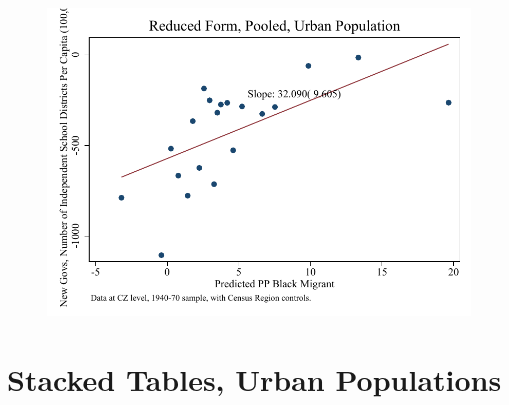 \documentclass{article}
\begin{document}
\begin{figure}
\centering
\includegraphics{figures/simplefigs/pooled_schdist_ind_pc_C3_urban_rf.pdf}
\end{figure}
\clearpage


\section{Stacked Tables, Urban Populations}
\end{document}
